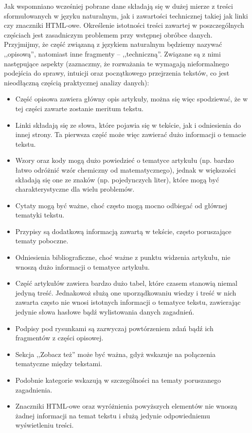 \documentclass{praca1}
\begin{document}
Jak wspomniano wcześniej pobrane dane składają się w dużej mierze z treści sformułowanych w języku naturalnym, jak i zawartości technicznej takiej jak linki czy znaczniki HTML-owe. Określenie istotności treści zawartej w poszczególnych częściach jest zasadniczym problemem przy wstępnej obróbce danych. Przyjmijmy, że część związaną z językiem naturalnym będziemy nazywać ,,opisową'', natomiast inne fragmenty -- ,,techniczną''. Związane są z nimi następujące aspekty (zaznaczmy, że rozważania te wymagają nieformalnego podejścia do sprawy, intuicji oraz początkowego przejrzenia tekstów, co jest nieodłączną częścią praktycznej analizy danych):
\begin{itemize}
\item Część opisowa zawiera główny opis artykuły, można się więc spodziewać, że w tej części zawarte zostanie meritum tekstu.
\item Linki składają się ze słowa, które pojawia się w tekście, jak i odniesienia do innej strony. Ta pierwsza część może więc zawierać dużo informacji o temacie tekstu.
\item Wzory oraz kody mogą dużo powiedzieć o tematyce artykułu (np. bardzo łatwo odróżnić wzór chemiczny od matematycznego), jednak w większości składają się one ze znaków (np. pojedynczych liter), które mogą być charakterystyczne dla wielu problemów.
\item Cytaty mogą być ważne, choć często mogą mocno odbiegać od głównej tematyki tekstu.
\item Przypisy są dodatkową informacją zawartą w tekście, często poruszające tematy poboczne.
\item Odniesienia bibliograficzne, choć ważne z punktu widzenia artykułu, nie wnoszą dużo informacji o tematyce artykułu.
\item Część artykułów zawiera bardzo dużo tabel, które czasem stanowią niemal jedyną treść. Jednakowoż służą one uporządkowaniu wiedzy i treść w nich zawarta często nie wnosi istotnych informacji o tematyce tekstu, zawierając jedynie słowa hasłowe bądź wylistowania danych zagadnień.
\item Podpisy pod rysunkami są zazwyczaj powtórzeniem zdań bądź ich fragmentów z części opisowej.
\item Sekcja ,,Zobacz też'' może być ważna, gdyż wskazuje na połączenia tematyczne między tekstami.
\item Podobnie kategorie wskazują w szczególności na tematy poruszanego zagadnienia.
\item Znaczniki HTML-owe oraz wyróżnienia powyższych elementów nie wnoszą żadnej informacji na temat tekstu i służą jedynie odpowiedniemu wyświetleniu treści.
\end{itemize}








\end{document}
